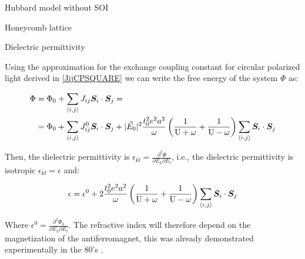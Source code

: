 \begin{section}{Hubbard model without SOI}
\begin{subsection}{Honeycomb lattice}
\end{subsection}

\begin{subsection}{Dielectric permittivity}

Using the approximation for the exchange coupling constant for circular polarized light derived in \ref{JijCPSQUARE} we can write the free energy of the system $\Phi$ as:

\begin{align}
\Phi &= \Phi_0 + \sum_{\langle i,j \rangle} J_{ij} \boldsymbol{S}_i \cdot \boldsymbol{S}_j = \nonumber \\
&= \Phi_0 + \sum_{\langle i,j \rangle} J_{ij}^0 \boldsymbol{S}_i \cdot \boldsymbol{S}_j + |\vec{E}_0|^2 \frac{t_0^2 e^2 a^2}{\omega}\left( \frac{1}{\text{U}+\omega} + \frac{1}{\text{U}-\omega} \right)\sum_{\langle i,j \rangle} \boldsymbol{S}_i \cdot \boldsymbol{S}_j
\end{align}

Then, the dielectric permittivity is $\epsilon_{kl} = \frac{\partial^2 \Phi}{\partial E_k \partial E_l}$, i.e., the dielectric permittivity is isotropic $\epsilon_{kl} = \epsilon$ and:

\begin{equation}
\epsilon = \epsilon^0 + 2\frac{t_0^2 e^2 a^2}{\omega}\left( \frac{1}{\text{U}+\omega} + \frac{1}{\text{U}-\omega} \right)\sum_{\langle i,j \rangle} \boldsymbol{S}_i \cdot \boldsymbol{S}_j
\end{equation}

Where $\epsilon^0 = \frac{\partial^2 \Phi_0}{\partial E_k \partial E_l}$. The refractive index will therefore depend on the magnetization of the antiferromagnet, this was already demonstrated experimentally in the 80's \cite{Demokritov1985}.
\end{subsection}

\end{section}